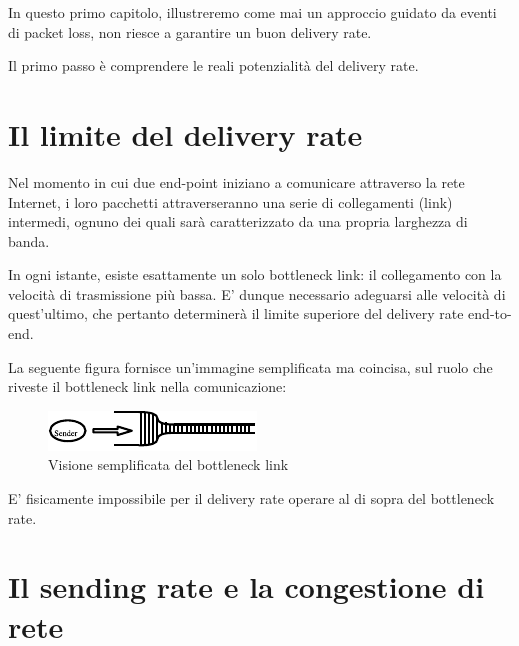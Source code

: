 
In questo primo capitolo, illustreremo come mai un approccio guidato da eventi di packet loss, non riesce a garantire un buon delivery rate. \bigskip

Il primo passo è comprendere le reali potenzialità del delivery rate.

\section{Il limite del delivery rate}

Nel momento in cui due end-point iniziano a comunicare attraverso la rete Internet, i loro pacchetti attraverseranno una serie di collegamenti (link) intermedi, ognuno dei quali sarà caratterizzato da una propria larghezza di banda. \bigskip


In ogni istante, esiste esattamente un solo bottleneck link: il collegamento con la velocità di trasmissione più bassa. E' dunque necessario adeguarsi alle velocità di quest'ultimo, che pertanto determinerà il limite superiore del delivery rate end-to-end. \bigskip

La seguente figura fornisce un'immagine semplificata ma coincisa, sul ruolo che riveste il bottleneck link nella comunicazione:

\begin{figure}[H]

\center
\caption{Visione semplificata del bottleneck link}
\includegraphics[scale=0.7]{chapters/failed/img/bottleneck_link}

\end{figure}

E' fisicamente impossibile per il delivery rate operare al di sopra del bottleneck rate. 

\section{Il sending rate e la congestione di rete}

%
%
%

